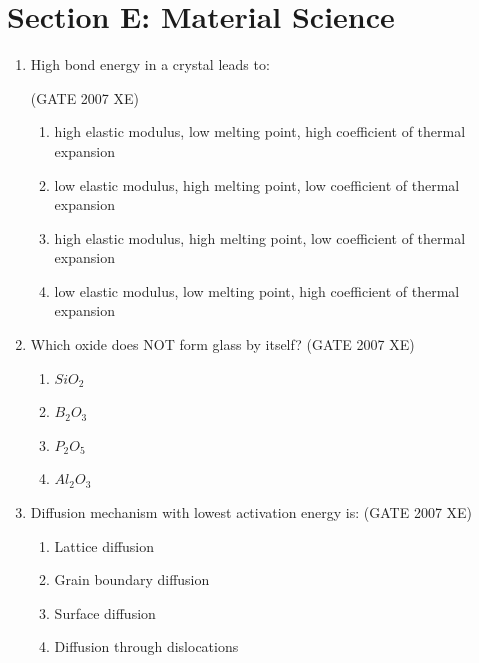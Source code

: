 \documentclass[journal,cmex10]{IEEEtran}
\theoremstyle{remark}
\numberwithin{equation}{enumi}
\numberwithin{figure}{enumi}
\begin{document}
\newpage
\section*{Section E: Material Science}

\begin{enumerate}
\vspace{2\baselineskip}


\item High bond energy in a crystal leads to:  

\hfill{(GATE 2007 XE)}
\begin{multicols}{2}
\begin{enumerate}
    \item high elastic modulus, low melting point, high coefficient of thermal expansion
    \item low elastic modulus, high melting point, low coefficient of thermal expansion
    \item high elastic modulus, high melting point, low coefficient of thermal expansion
    \item low elastic modulus, low melting point, high coefficient of thermal expansion
\end{enumerate}
\end{multicols}
\item Which oxide does NOT form glass by itself?  
\hfill{(GATE 2007 XE)}
\begin{multicols}{4}
\begin{enumerate}
    \item $SiO_{2}$
    \item $B_2$$O_3$
    \item $P_2$$O_5$
    \item $Al_2$$O_3$
\end{enumerate}
\end{multicols}


\item Diffusion mechanism with lowest activation energy is:  
\hfill{(GATE 2007 XE)}
\begin{multicols}{2}
\begin{enumerate}
    \item Lattice diffusion
    \item Grain boundary diffusion
    \item Surface diffusion
    \item Diffusion through dislocations
\end{enumerate}
\end{multicols}


\end{enumerate}
\end{document}

